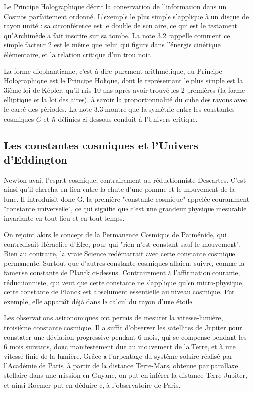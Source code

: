 \documentclass[a4paper,12pt]{article}
\begin{document}
 Le Principe Holographique décrit la conservation de l'information dans un Cosmos parfaitement ordonné. L'exemple le plus simple s'applique à un disque de rayon unité : sa circonférence est le double de son aire, ce qui est le testament qu'Archimède a fait inscrire sur sa tombe. La note 3.2 rappelle comment ce simple facteur 2 est le même que celui qui figure dans l'énergie cinétique élémentaire, et la relation critique d'un trou noir.

La forme diophantienne, c'est-à-dire purement arithmétique, du Principe Holographique est le Principe Holique, dont le représentant le plus simple est la 3ième loi de Képler, qu'il mis 10 ans après avoir trouvé les 2 premières (la forme elliptique et la loi des aires), à savoir la proportionnalité du cube des rayons avec le carré des périodes. La note 3.3 montre que la symétrie entre les constantes cosmiques $G$ et $\hbar$ définies ci-dessous conduit à l'Univers critique.

\subsection{Les constantes cosmiques et l'Univers d'Eddington}

Newton avait l'esprit cosmique, contrairement au réductionniste Descartes. C'est ainsi qu'il chercha un lien entre la chute d'une pomme et le mouvement de la lune. Il introduisit donc G, la première "constante cosmique" appelée couramment "constante universelle", ce qui signifie que c'est une grandeur physique mesurable invariante en tout lieu et en tout temps. 

On rejoint alors le concept de la Permanence Cosmique de Parménide, qui contredisait Héraclite d'Elée, pour qui "rien n'est constant sauf le mouvement". Bien au contraire, la vraie Science  redémarrait avec cette constante cosmique permanente. Surtout que d'autres constante cosmiques allaient suivre, comme la fameuse constante de Planck ci-dessus. Contrairement à l'affirmation courante, réductionniste, qui veut que cette constante ne s'applique qu'en micro-physique, cette constante de Planck est absolument essentielle au niveau cosmique. Par exemple, elle apparaît déjà dans le calcul du rayon d'une étoile.

Les observations astronomiques ont permis de mesurer la vitesse-lumière, troisième constante cosmique. Il a suffit d'observer les satellites de Jupiter pour constater une déviation progressive pendant 6 mois, qui se compense pendant les 6 mois suivants, donc manifestement due au mouvement de la Terre, et à une vitesse finie de la lumière. Grâce à l'arpentage du système solaire réalisé par l'Académie de Paris, à partir de la distance Terre-Mars, obtenue par parallaxe stellaire dans une mission en Guyane, on put en inférer la distance Terre-Jupiter, et ainsi Roemer put en déduire c, à l'observatoire de Paris.
\end{document}
